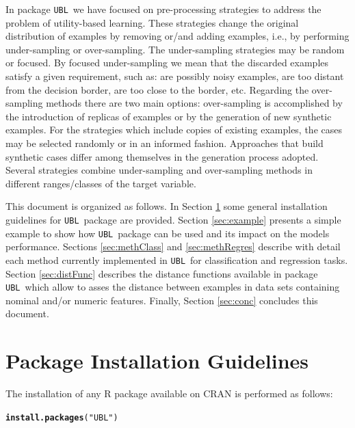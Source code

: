 \documentclass[10pt,a4paper]{article}\usepackage[]{graphicx}\usepackage[]{color}
\makeatletter
\newcommand{\hlstr}[1]{\textcolor[rgb]{0.192,0.494,0.8}{#1}}%
\newcommand{\hlstd}[1]{\textcolor[rgb]{0.345,0.345,0.345}{#1}}%
\newcommand{\hlkwd}[1]{\textcolor[rgb]{0.737,0.353,0.396}{\textbf{#1}}}%
\newenvironment{kframe}{%
 \def\at@end@of@kframe{}%
 \ifinner\ifhmode%
  \def\at@end@of@kframe{\end{minipage}}%
  \begin{minipage}{\columnwidth}%
 \fi\fi%
 \def\FrameCommand##1{\hskip\@totalleftmargin \hskip-\fboxsep
 \colorbox{shadecolor}{##1}\hskip-\fboxsep
     \hskip-\linewidth \hskip-\@totalleftmargin \hskip\columnwidth}%
 \MakeFramed {\advance\hsize-\width
   \@totalleftmargin\z@ \linewidth\hsize
   \@setminipage}}%
 {\par\unskip\endMakeFramed%
 \at@end@of@kframe}
\newenvironment{knitrout}{}{} %
\newcommand{\UBL}{\texttt{UBL}\ }
\newcommand{\pUBL}{package \texttt{UBL}\ }
\newcommand{\UBLp}{\texttt{UBL}\ package  }
\makeatother
\begin{document}
In \pUBL we have focused on pre-processing strategies to address the problem of utility-based learning. These strategies change the original distribution of examples by removing or/and adding examples, i.e., by performing under-sampling or over-sampling. The under-sampling strategies may be random or focused. By focused under-sampling we mean that the discarded examples satisfy a given requirement, such as: are possibly noisy examples, are too distant from the decision border, are too close to the border, etc. Regarding the over-sampling methods there are two main options: over-sampling is accomplished by the introduction of replicas of examples or by the generation of new synthetic examples. For the strategies which include copies of existing examples, the cases may be selected randomly or in an informed fashion. Approaches that build synthetic cases differ among themselves in the generation process adopted. Several strategies combine under-sampling and over-sampling methods in different ranges/classes of the target variable.

This document is organized as follows. In Section \ref{sec:instal} some general installation guidelines for \UBLp are provided. Section \ref{sec:example} presents a simple example to show how \UBLp can be used and its impact on the models performance. Sections \ref{sec:methClass} and \ref{sec:methRegres} describe with detail each method currently implemented in \UBL for classification and regression tasks. Section \ref{sec:distFunc} describes the distance functions available in \pUBL which allow to asses the distance between examples in data sets containing nominal and/or numeric features. Finally, Section \ref{sec:conc} concludes this document.

\section{Package Installation Guidelines}\label{sec:instal}

The installation of any R package available on CRAN is performed as follows:
\begin{knitrout}\footnotesize
{}\color{fgcolor}\begin{kframe}
\begin{alltt}
\hlkwd{install.packages}\hlstd{(}\hlstr{"UBL"}\hlstd{)}
\end{alltt}
\end{kframe}
\end{knitrout}
\end{document}
